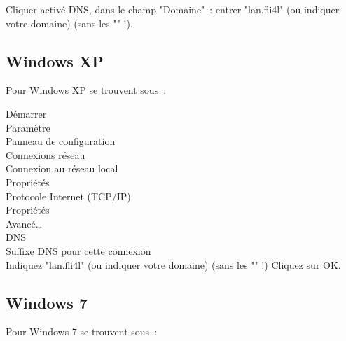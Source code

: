   Cliquer activé DNS, dans le champ "Domaine"~: entrer "lan.fli4l"
  (ou indiquer votre domaine) (sans les "" !).

\subsection{Windows XP}

  Pour Windows XP se trouvent sous~:

  \noindent Démarrer \pfeil\\
  \hspace*{2ex}Paramètre \pfeil\\
  \hspace*{4ex}Panneau de configuration \pfeil\\
  \hspace*{6ex}Connexions réseau \pfeil\\
  \hspace*{8ex}Connexion au réseau local \pfeil\\
  \hspace*{10ex}Propriétés \pfeil\\
  \hspace*{12ex}Protocole Internet (TCP/IP) \pfeil\\
  \hspace*{14ex}Propriétés \pfeil\\
  \hspace*{16ex}Avancé\ldots \pfeil\\
  \hspace*{18ex}DNS \pfeil\\
  \hspace*{20ex}Suffixe DNS pour cette connexion \pfeil\\

  Indiquez "lan.fli4l" (ou indiquer votre domaine) (sans les "" !)
  \pfeil Cliquez sur OK.

  \subsection{Windows 7}

  Pour Windows 7 se trouvent sous~:

